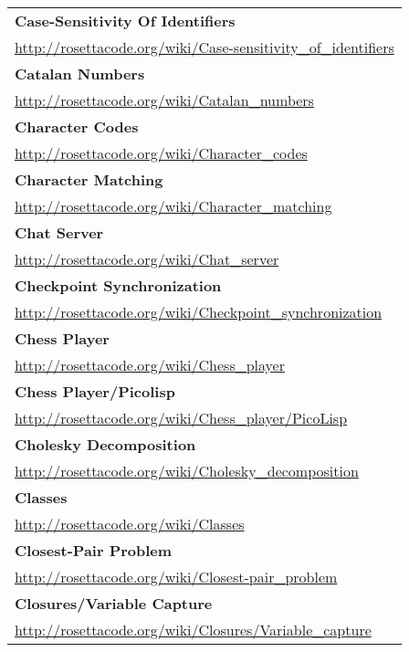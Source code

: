 \begin{longtable}{l}
\textbf{
Case-Sensitivity Of Identifiers } \\ \href{http://rosettacode.org/wiki/Case-sensitivity\_of\_identifiers}{http://rosettacode.org/wiki/Case-sensitivity\_of\_identifiers} \\
\textbf{Catalan Numbers } \\ \href{http://rosettacode.org/wiki/Catalan\_numbers}{http://rosettacode.org/wiki/Catalan\_numbers} \\
\textbf{Character Codes } \\ \href{http://rosettacode.org/wiki/Character\_codes}{http://rosettacode.org/wiki/Character\_codes} \\
\textbf{
Character Matching } \\ \href{http://rosettacode.org/wiki/Character\_matching}{http://rosettacode.org/wiki/Character\_matching} \\
\textbf{Chat Server } \\ \href{http://rosettacode.org/wiki/Chat\_server}{http://rosettacode.org/wiki/Chat\_server} \\
\textbf{Checkpoint Synchronization } \\ \href{http://rosettacode.org/wiki/Checkpoint\_synchronization}{http://rosettacode.org/wiki/Checkpoint\_synchronization} \\
\textbf{
Chess Player } \\ \href{http://rosettacode.org/wiki/Chess\_player}{http://rosettacode.org/wiki/Chess\_player} \\
\textbf{Chess Player/Picolisp } \\ \href{http://rosettacode.org/wiki/Chess\_player/PicoLisp}{http://rosettacode.org/wiki/Chess\_player/PicoLisp} \\
\textbf{Cholesky Decomposition } \\ \href{http://rosettacode.org/wiki/Cholesky\_decomposition}{http://rosettacode.org/wiki/Cholesky\_decomposition} \\
\textbf{
Classes } \\ \href{http://rosettacode.org/wiki/Classes}{http://rosettacode.org/wiki/Classes} \\
\textbf{Closest-Pair Problem } \\ \href{http://rosettacode.org/wiki/Closest-pair\_problem}{http://rosettacode.org/wiki/Closest-pair\_problem} \\
\textbf{Closures/Variable Capture } \\ \href{http://rosettacode.org/wiki/Closures/Variable\_capture}{http://rosettacode.org/wiki/Closures/Variable\_capture} \\

\end{longtable}
